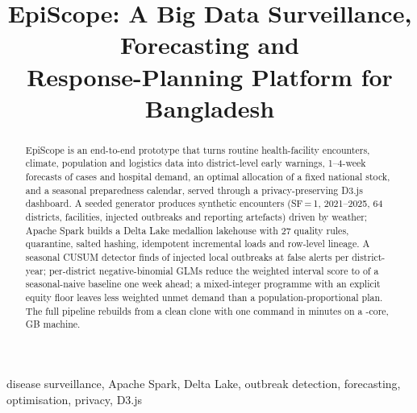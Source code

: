 \documentclass[conference]{IEEEtran}
\begin{document}
\title{EpiScope: A Big Data Surveillance, Forecasting and\\ Response-Planning Platform for Bangladesh}
\author{
}
\maketitle

\begin{abstract}
EpiScope is an end-to-end prototype that turns routine health-facility encounters, climate, population and
logistics data into district-level early warnings, 1--4-week forecasts of cases and hospital demand, an
optimal allocation of a fixed national stock, and a seasonal preparedness calendar, served through a
privacy-preserving D3.js dashboard. A seeded generator produces \GenRows{} synthetic encounters (SF\,=\,1,
2021--2025, 64 districts, \GenFacilities{} facilities, \GenOutbreaks{} injected outbreaks and reporting artefacts)
driven by weather; Apache Spark builds a Delta Lake medallion lakehouse with 27 quality rules, quarantine,
salted hashing, idempotent incremental loads and row-level lineage. A seasonal CUSUM detector finds
\SensLocal{} of injected local outbreaks at \FAperDY{} false alerts per district-year; per-district
negative-binomial GLMs reduce the weighted interval score to \GlmRelWISOne{} of a seasonal-naive baseline one
week ahead; a mixed-integer programme with an explicit equity floor leaves less weighted unmet demand than a
population-proportional plan. The full pipeline rebuilds from a clean clone with one command in
\DagMinutes{} minutes on a \HwCpus{}-core, \HwMem{}\,GB machine.
\end{abstract}
\begin{IEEEkeywords}
disease surveillance, Apache Spark, Delta Lake, outbreak detection, forecasting, optimisation, privacy, D3.js
\end{IEEEkeywords}

\end{document}
